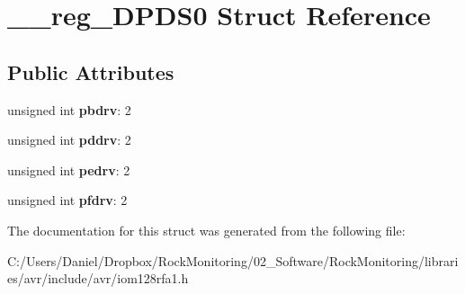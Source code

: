\hypertarget{struct____reg___d_p_d_s0}{}\section{\+\_\+\+\_\+reg\+\_\+\+D\+P\+D\+S0 Struct Reference}
\label{struct____reg___d_p_d_s0}
\subsection*{Public Attributes}
\begin{DoxyCompactItemize}
\item 
unsigned int {\bfseries pbdrv}\+: 2\hypertarget{struct____reg___d_p_d_s0_aa77a846270232f8bde26c5604614b036}{}\label{struct____reg___d_p_d_s0_aa77a846270232f8bde26c5604614b036}

\item 
unsigned int {\bfseries pddrv}\+: 2\hypertarget{struct____reg___d_p_d_s0_a11791262223b5aee1a8c0efc966e9ed1}{}\label{struct____reg___d_p_d_s0_a11791262223b5aee1a8c0efc966e9ed1}

\item 
unsigned int {\bfseries pedrv}\+: 2\hypertarget{struct____reg___d_p_d_s0_a0d038e4cbf71b43550261eeb2da5b3e8}{}\label{struct____reg___d_p_d_s0_a0d038e4cbf71b43550261eeb2da5b3e8}

\item 
unsigned int {\bfseries pfdrv}\+: 2\hypertarget{struct____reg___d_p_d_s0_aa76ad6b6d458b72e2c743029128e5dfd}{}\label{struct____reg___d_p_d_s0_aa76ad6b6d458b72e2c743029128e5dfd}

\end{DoxyCompactItemize}


The documentation for this struct was generated from the following file\+:\begin{DoxyCompactItemize}
\item 
C\+:/\+Users/\+Daniel/\+Dropbox/\+Rock\+Monitoring/02\+\_\+\+Software/\+Rock\+Monitoring/libraries/avr/include/avr/iom128rfa1.\+h\end{DoxyCompactItemize}
